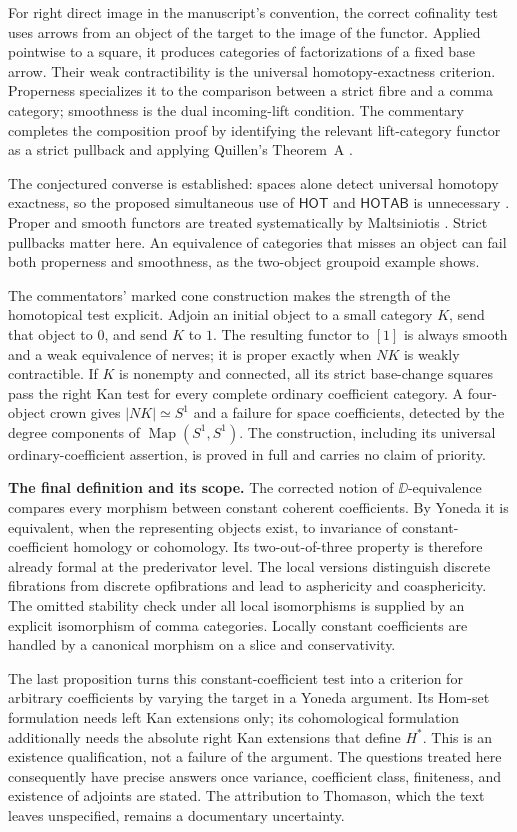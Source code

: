 For right direct image in the manuscript's convention, the correct cofinality test uses arrows from an object of the target to the image of the functor. Applied pointwise to a square, it produces categories of factorizations of a fixed base arrow. Their weak contractibility is the universal homotopy-exactness criterion. Properness specializes it to the comparison between a strict fibre and a comma category; smoothness is the dual incoming-lift condition. The commentary completes the composition proof by identifying the relevant lift-category functor as a strict pullback and applying Quillen's Theorem~A \citep[\S1]{Quillen1973}.

The conjectured converse is established: spaces alone detect universal homotopy exactness, so the proposed simultaneous use of $\mathsf{HOT}$ and $\mathsf{HOTAB}$ is unnecessary \citep[Theorem~3.16]{GrothPontoShulman2014}. Proper and smooth functors are treated systematically by Maltsiniotis \citep[Theorem~1.2]{Maltsiniotis2005Asphericite}. Strict pullbacks matter here. An equivalence of categories that misses an object can fail both properness and smoothness, as the two-object groupoid example shows.

The commentators' marked cone construction makes the strength of the homotopical test explicit. Adjoin an initial object to a small category $K$, send that object to $0$, and send $K$ to $1$. The resulting functor to $[1]$ is always smooth and a weak equivalence of nerves; it is proper exactly when $NK$ is weakly contractible. If $K$ is nonempty and connected, all its strict base-change squares pass the right Kan test for every complete ordinary coefficient category. A four-object crown gives $|NK|\simeq S^1$ and a failure for space coefficients, detected by the degree components of $\operatorname{Map}(S^1,S^1)$. The construction, including its universal ordinary-coefficient assertion, is proved in full and carries no claim of priority.

\medskip\noindent\textbf{The final definition and its scope.}
The corrected notion of $\DD$-equivalence compares every morphism between constant coherent coefficients. By Yoneda it is equivalent, when the representing objects exist, to invariance of constant-coefficient homology or cohomology. Its two-out-of-three property is therefore already formal at the prederivator level. The local versions distinguish discrete fibrations from discrete opfibrations and lead to asphericity and coasphericity. The omitted stability check under all local isomorphisms is supplied by an explicit isomorphism of comma categories. Locally constant coefficients are handled by a canonical morphism on a slice and conservativity.

The last proposition turns this constant-coefficient test into a criterion for arbitrary coefficients by varying the target in a Yoneda argument. Its Hom-set formulation needs left Kan extensions only; its cohomological formulation additionally needs the absolute right Kan extensions that define $H^*$. This is an existence qualification, not a failure of the argument. The questions treated here consequently have precise answers once variance, coefficient class, finiteness, and existence of adjoints are stated. The attribution to Thomason, which the text leaves unspecified, remains a documentary uncertainty.
